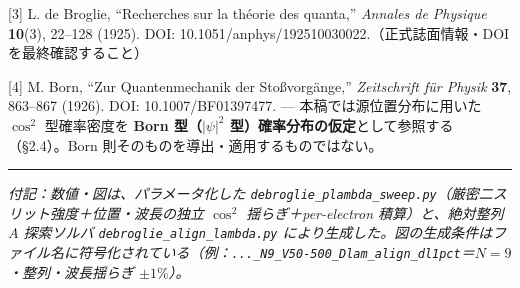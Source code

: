 \documentclass[11pt,a4paper]{ltjsarticle}
\begin{document}
{[}3{]} L. de Broglie, ``Recherches sur la théorie des quanta,''
\emph{Annales de Physique} \textbf{10}(3), 22--128 (1925). DOI:
10.1051/anphys/192510030022.（正式誌面情報・DOI を最終確認すること）

{[}4{]} M. Born, ``Zur Quantenmechanik der Stoßvorgänge,''
\emph{Zeitschrift für Physik} \textbf{37}, 863--867 (1926). DOI:
10.1007/BF01397477. --- 本稿では源位置分布に用いた \(\cos^2\)
型確率密度を \textbf{Born 型（\(|\psi|^2\)
型）確率分布の仮定}として参照する（§2.4）。Born
則そのものを導出・適用するものではない。

\begin{center}\rule{0.5\linewidth}{0.5pt}\end{center}

\emph{付記：数値・図は、パラメータ化した
\texttt{debroglie\_plambda\_sweep.py}（厳密二スリット強度＋位置・波長の独立
\(\cos^2\) 揺らぎ＋per-electron 積算）と、絶対整列 \(A\) 探索ソルバ
\texttt{debroglie\_align\_lambda.py}
により生成した。図の生成条件はファイル名に符号化されている（例：\texttt{...\_N9\_V50-500\_Dlam\_align\_dl1pct}＝\(N{=}9\)・整列・波長揺らぎ
\(\pm1\%\)）。}
\end{document}
